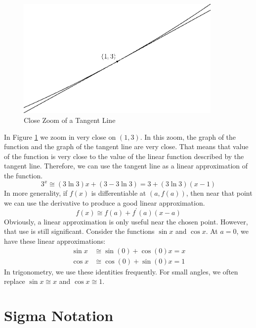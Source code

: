 \documentclass[fleqn]{report}
\begin{document}
\begin{figure}[t]
\centering
\includegraphics[width=10cm]{figure52.eps}
\caption{Close Zoom of a Tangent Line}
\label{Close Zoom of a Tangent Line}
\end{figure}

In Figure \ref{Close Zoom of a Tangent Line} we zoom in very
close on $(1,3)$.  In this zoom, the graph of the function and
the graph of the tangent line are very close. That means that
value of the function is very close to the value of the linear
function described by the tangent line. Therefore, we can use
the tangent line as a linear approximation of the function. 
\begin{equation*}
3^x \cong (3 \ln 3) x + (3 - 3 \ln 3) = 3 + (3 \ln 3) (x- 1)
\end{equation*}
In more generality, if $f(x)$ is differentiable at $(a,
f(a))$, then near that point we can use the derivative to
produce a good linear approximation.
\begin{equation*}
f(x) \cong f(a) + f^\prime(a) (x-a)
\end{equation*}
Obviously, a linear approximation is only useful near the
chosen point. However, that use is still significant.
Consider the functions $\sin x$ and $\cos x$. At $a=0$, we
have these linear approximations:
\begin{align*}
\sin x & \cong \sin (0) + \cos (0) x = x \\
\cos x & \cong \cos (0) + \sin (0) x = 1
\end{align*}
In trigonometry, we use these identities frequently. For small
angles, we often replace $\sin x \cong x$ and $\cos x \cong 1$.

\chapter{Sigma Notation}
\label{Sigma Notation}
\end{document}
